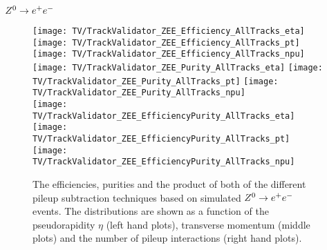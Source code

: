 \subsubsection{$\Zz\rightarrow\EE$ \label{sec:TASEFRDACPZEE}}

\begin{figure}[Hb]
    \centering
    \texttt{[image: TV/TrackValidator\_ZEE\_Efficiency\_AllTracks\_eta]}
    \texttt{[image: TV/TrackValidator\_ZEE\_Efficiency\_AllTracks\_pt]}
    \texttt{[image: TV/TrackValidator\_ZEE\_Efficiency\_AllTracks\_npu]}
    \\
    \texttt{[image: TV/TrackValidator\_ZEE\_Purity\_AllTracks\_eta]}
    \texttt{[image: TV/TrackValidator\_ZEE\_Purity\_AllTracks\_pt]}
    \texttt{[image: TV/TrackValidator\_ZEE\_Purity\_AllTracks\_npu]}
    \\
    \texttt{[image: TV/TrackValidator\_ZEE\_EfficiencyPurity\_AllTracks\_eta]}
    \texttt{[image: TV/TrackValidator\_ZEE\_EfficiencyPurity\_AllTracks\_pt]}
    \texttt{[image: TV/TrackValidator\_ZEE\_EfficiencyPurity\_AllTracks\_npu]}
    \caption[Efficiencies, purities and their product of the different pileup subtraction techniques based on simulated $\Zz\rightarrow\EE$ events]{The efficiencies, purities and the product of both of the different pileup subtraction techniques based on simulated $\Zz\rightarrow\EE$ events. The distributions are shown as a function of the pseudorapidity $\eta$ (left hand plots), transverse momentum (middle plots) and the number of pileup interactions (right hand plots). \label{plot:TACOAACPZEESignal}}
\end{figure}

